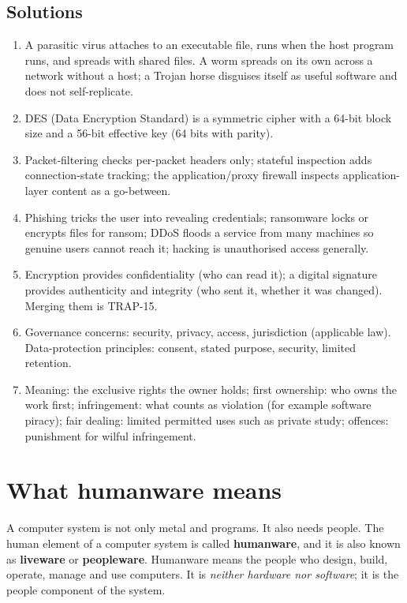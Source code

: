 \subsection*{Solutions}
\begingroup\small
\begin{enumerate}[label=\arabic*.]
  \item A parasitic virus attaches to an executable file, runs when the host
    program runs, and spreads with shared files. A worm spreads on its own
    across a network without a host; a Trojan horse disguises itself as useful
    software and does not self-replicate.
  \item DES (Data Encryption Standard) is a symmetric cipher with a 64-bit
    block size and a 56-bit effective key (64 bits with parity).
  \item Packet-filtering checks per-packet headers only; stateful inspection
    adds connection-state tracking; the application/proxy firewall inspects
    application-layer content as a go-between.
  \item Phishing tricks the user into revealing credentials; ransomware locks
    or encrypts files for ransom; DDoS floods a service from many machines so
    genuine users cannot reach it; hacking is unauthorised access generally.
  \item Encryption provides confidentiality (who can read it); a digital
    signature provides authenticity and integrity (who sent it, whether it was
    changed). Merging them is TRAP-15.
  \item Governance concerns: security, privacy, access, jurisdiction
    (applicable law). Data-protection principles: consent, stated purpose,
    security, limited retention.
  \item Meaning: the exclusive rights the owner holds; first ownership: who
    owns the work first; infringement: what counts as violation (for example
    software piracy); fair dealing: limited permitted uses such as private
    study; offences: punishment for wilful infringement.
\end{enumerate}
\endgroup

\section{What humanware means}
A computer system is not only metal and programs. It also needs people. The
human element of a computer system is called \textbf{humanware}, and it is
also known as \textbf{liveware} or \textbf{peopleware}. Humanware means the
people who design, build, operate, manage and use computers. It is
\emph{neither hardware nor software}; it is the people component of the
system.

